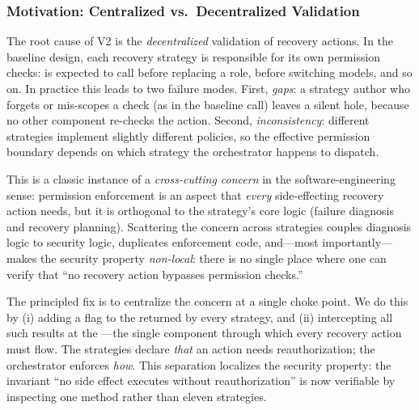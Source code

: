 \subsubsection{Motivation: Centralized vs.\ Decentralized Validation}
The root cause of V2 is the \emph{decentralized} validation of recovery actions. In the baseline design, each recovery strategy is responsible for its own permission checks:  is expected to call  before replacing a role,  before switching models, and so on. In practice this leads to two failure modes. First, \emph{gaps}: a strategy author who forgets or mis-scopes a check (as in the baseline  call) leaves a silent hole, because no other component re-checks the action. Second, \emph{inconsistency}: different strategies implement slightly different policies, so the effective permission boundary depends on which strategy the orchestrator happens to dispatch.

This is a classic instance of a \emph{cross-cutting concern} in the software-engineering sense: permission enforcement is an aspect that \emph{every} side-effecting recovery action needs, but it is orthogonal to the strategy's core logic (failure diagnosis and recovery planning). Scattering the concern across strategies couples diagnosis logic to security logic, duplicates enforcement code, and---most importantly---makes the security property \emph{non-local}: there is no single place where one can verify that ``no recovery action bypasses permission checks.''

The principled fix is to centralize the concern at a single choke point. We do this by (i) adding a  flag to the  returned by every strategy, and (ii) intercepting all such results at the ---the single component through which every recovery action must flow. The strategies declare \emph{that} an action needs reauthorization; the orchestrator enforces \emph{how}. This separation localizes the security property: the invariant ``no side effect executes without reauthorization'' is now verifiable by inspecting one method rather than eleven strategies.

